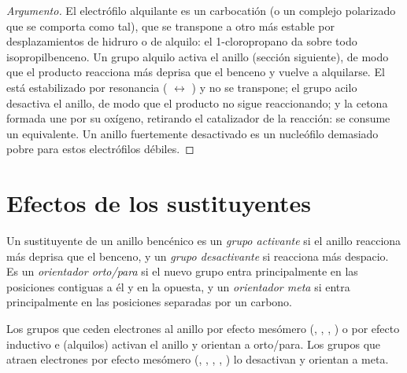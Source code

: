 \begin{proof}[Argumento]
El electrófilo alquilante es un carbocatión (o un complejo polarizado que se comporta como tal),
que se transpone a otro más estable por desplazamientos de hidruro o de alquilo: el 1-cloropropano da
sobre todo isopropilbenceno. Un grupo alquilo activa el anillo (sección siguiente), de modo que el producto
reacciona más deprisa que el benceno y vuelve a alquilarse. El  está estabilizado por
resonancia ( $\leftrightarrow$ ) y no se transpone; el grupo acilo
desactiva el anillo, de modo que el producto no sigue reaccionando; y la cetona formada une
 por su oxígeno, retirando el catalizador de la reacción: se consume un
equivalente. Un anillo fuertemente desactivado es un nucleófilo demasiado pobre para estos electrófilos débiles.
\end{proof}

\section{Efectos de los sustituyentes}

\begin{definition}\label{def:b2:aromatic-substitution:directing}
Un sustituyente de un anillo bencénico es un \emph{grupo activante} si el
anillo reacciona más deprisa que el benceno, y un \emph{grupo desactivante} si
reacciona más despacio. Es un \emph{orientador orto/para} si el nuevo
grupo entra principalmente en las posiciones contiguas a él y en la opuesta, y un \emph{orientador
meta} si entra principalmente en las posiciones separadas por un carbono.
\end{definition}

\begin{proposition}\label{prop:b2:aromatic-substitution:directing}
Los grupos que ceden electrones al anillo por efecto mesómero (, , ,
) o por efecto inductivo e  (alquilos) activan el anillo y orientan
a orto/para. Los grupos que atraen electrones por efecto mesómero (, , ,
, ) lo desactivan y orientan a meta.
\end{proposition}

